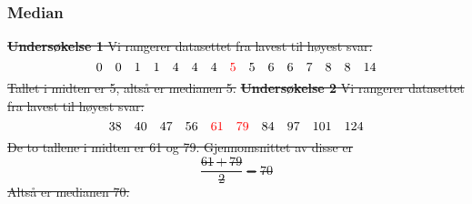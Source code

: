 \subsubsection{Median}
\st{
\textbf{Undersøkelse 1} \os
Vi rangerer datasettet fra lavest til høyest svar:
\[0\quad0\quad 1\quad 1\quad 4\quad 4\quad 4\quad  {\color{red} 5}\quad 5\quad  6\quad6\quad  7\quad8\quad8 \quad14\]
Tallet i midten er 5, altså er medianen 5.
}
\st{
\textbf{Undersøkelse 2} \os
Vi rangerer datasettet fra lavest til høyest svar:
 \[ 38\quad40\quad47\quad 56\quad {\color{red} 61}\quad{\color{red} 79}\quad 84\quad97\quad 101\quad 124  \]
De to tallene i midten er 61 og 79. Gjennomsnittet av disse er
\[ \frac{61+79}{2}=70 \]
Altså er medianen 70.
}


